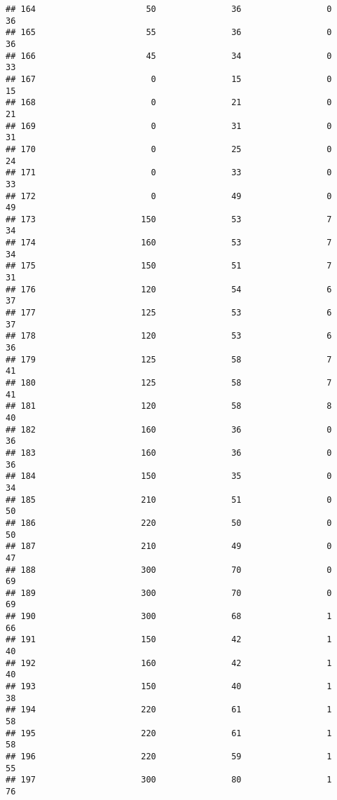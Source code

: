 \documentclass[
]{article}
\begin{document}
\begin{verbatim}
## 164                      50               36                 0         36
## 165                      55               36                 0         36
## 166                      45               34                 0         33
## 167                       0               15                 0         15
## 168                       0               21                 0         21
## 169                       0               31                 0         31
## 170                       0               25                 0         24
## 171                       0               33                 0         33
## 172                       0               49                 0         49
## 173                     150               53                 7         34
## 174                     160               53                 7         34
## 175                     150               51                 7         31
## 176                     120               54                 6         37
## 177                     125               53                 6         37
## 178                     120               53                 6         36
## 179                     125               58                 7         41
## 180                     125               58                 7         41
## 181                     120               58                 8         40
## 182                     160               36                 0         36
## 183                     160               36                 0         36
## 184                     150               35                 0         34
## 185                     210               51                 0         50
## 186                     220               50                 0         50
## 187                     210               49                 0         47
## 188                     300               70                 0         69
## 189                     300               70                 0         69
## 190                     300               68                 1         66
## 191                     150               42                 1         40
## 192                     160               42                 1         40
## 193                     150               40                 1         38
## 194                     220               61                 1         58
## 195                     220               61                 1         58
## 196                     220               59                 1         55
## 197                     300               80                 1         76

\end{verbatim}
\end{document}
